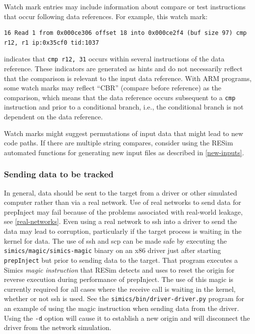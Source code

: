 \documentclass[titlepage]{article}
\begin{document}
Watch mark entries may include information about compare or test instructions that occur following data references.  For example, this watch mark:

\begin{verbatim}
16 Read 1 from 0x000ce306 offset 18 into 0x000ce2f4 (buf size 97) cmp r12, r1 ip:0x35cf0 tid:1037
\end{verbatim}
\noindent indicates that {\tt cmp r12, 31} occurs within several instructions of the data reference.  These indicators are generated as hints and do not necessarily reflect
that the comparison is relevant to the input data reference.  With ARM programs, some watch marks may reflect ``CBR'' (compare before reference) as the comparison, 
which means that the data reference occurs subsequent to a {\tt cmp} instruction and prior to a conditional branch, i.e., the conditional branch is not dependent on the data reference.

Watch marks might suggest permutations of input data that might lead to new code paths.  If there are multiple string compares, consider using the RESim 
automated functions for generating new input files as described in \ref{new-inputs}.

\subsubsection{Sending data to be tracked}
In general, data should be sent to the target from a driver or other simulated computer rather than via a real network.  Use of real networks to
send data for prepInject may fail because of the problems associated with real-world leakage, see \ref{real-networks}.
Even using a real network to ssh into a driver to send the data may lead to corruption, particularly if the target process is waiting in the 
kernel for data.  The use of ssh and scp can be made safe by executing the {\tt simics/magic/simics-magic} binary on an x86 driver just after
starting {\tt prepInject} but prior to sending data to the target.  That program executes a Simics \textit{magic instruction} that RESim 
detects and uses to reset the origin for reverse execution during performance of prepInject.  The use of this magic is currently required for all
cases where the receive call is waiting in the kernel, whether or not ssh is used.  See the {\tt simics/bin/driver-driver.py} program for an example
of using the magic instruction when sending data from the driver.  Using the {\tt -d} option will cause it to establish a new origin and will disconnect
the driver from the network simulation.
\end{document}
